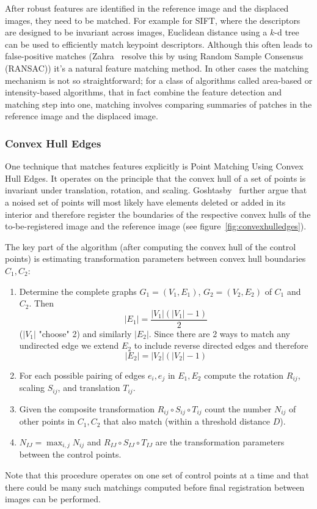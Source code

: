 After robust features are identified in the reference image and the displaced images, they need to be matched.
%
For example for SIFT, where the descriptors are designed to be invariant across images, Euclidean distance using a \(k\)-d tree can be used to efficiently match keypoint descriptors.
%
Although this often leads to false-positive matches (Zahra \etal~resolve this by using Random Sample Consensus (RANSAC)) it's a natural feature matching method.
%
In other cases the matching mechanism is not so straightforward; for a class of algorithms called area-based or intensity-based algorithms, that in fact combine the feature detection and matching step into one, matching involves comparing summaries of patches in the reference image and the displaced image.

\subsubsection{Convex Hull Edges}
%
One technique that matches features explicitly is Point Matching Using Convex Hull Edges\cite{Goshtasby1985}.
%
It operates on the principle that the convex hull of a set of points is invariant under translation, rotation, and scaling.
%
Goshtasby \etal~further argue that a noised set of points will most likely have elements deleted or added in its interior and therefore register the boundaries of the respective convex hulls of the to-be-registered image and the reference image (see figure~\ref{fig:convexhulledges}).
%

The key part of the algorithm (after computing the convex hull of the control points) is estimating transformation parameters between convex hull boundaries \(C_1, C_2\):
%
\begin{framed}
	\begin{enumerate}
		\item Determine the complete graphs \(G_1=(V_1, E_1)\), \(G_2 = (V_2,E_2)\) of \(C_1\) and \(C_2\). Then \[|E_1| = \frac{|V_1| (|V_1|-1)}{2}\] (\(|V_1|\) "choose" 2) and similarly \(|E_2|\). Since there are 2 ways to match any undirected edge we extend \(E_2\) to include reverse directed edges and therefore \[|E_2| = |V_2| (|V_2|-1)\]
		\item For each possible pairing of edges \(e_i, e_j\) in \(E_1, E_2\) compute the rotation \(R_{ij}\), scaling \(S_{ij}\), and translation \(T_{ij}\).
		\item Given the composite transformation \(R_{ij} \circ S_{ij} \circ T_{ij}\) count the number \(N_{ij}\) of other points in \(C_1, C_2\) that also match (within a threshold distance \(D\)).
		\item \(N_{IJ} = \max_{i,j} N_{ij}\) and \(R_{IJ} \circ S_{IJ} \circ T_{IJ}\) are the transformation parameters between the control points.
	\end{enumerate}
\end{framed}
%
Note that this procedure operates on one set of control points at a time and that there could be many such matchings computed before final registration between images can be performed.

